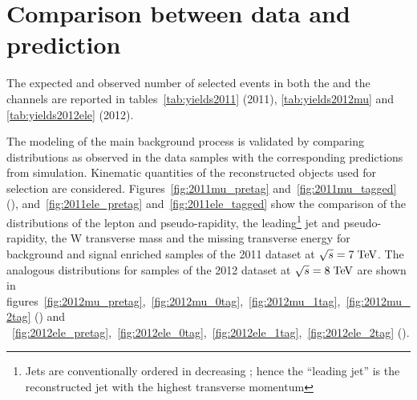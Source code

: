 \section{Comparison between data and prediction}
\label{sec:datamc}

The expected and observed number of selected events in both the \mujets{} and
the \ejets{} channels are reported in tables~\ref{tab:yields2011}
(2011), \ref{tab:yields2012mu} and \ref{tab:yields2012ele} (2012).



The modeling of the main background process is validated by comparing
distributions as observed in the data samples with the corresponding
predictions from simulation. Kinematic quantities of the reconstructed
objects used for selection are
considered. Figures~\ref{fig:2011mu_pretag}
and~\ref{fig:2011mu_tagged} (\mujets{}), and~\ref{fig:2011ele_pretag}
and~\ref{fig:2011ele_tagged} show the comparison of the distributions
of the lepton \pt{} and pseudo-rapidity, the leading\footnote{Jets are
conventionally ordered in decreasing \pt{}; hence the ``leading jet''
is the reconstructed jet with the highest transverse momentum} jet
\pt{} and pseudo-rapidity, the W transverse mass and the missing
transverse energy for background and signal enriched samples of the
2011 dataset at $\sqrt{s} = 7 \; \mathrm{TeV}{}$. The analogous distributions for
samples of the 2012 dataset at $\sqrt{s} = 8 \; \mathrm{TeV}{}$ are shown in
figures~\ref{fig:2012mu_pretag},~\ref{fig:2012mu_0tag},~\ref{fig:2012mu_1tag},~\ref{fig:2012mu_2tag}
(\mujets{}) and
~\ref{fig:2012ele_pretag},~\ref{fig:2012ele_0tag},~\ref{fig:2012ele_1tag},~\ref{fig:2012ele_2tag} (\ejets{}).

